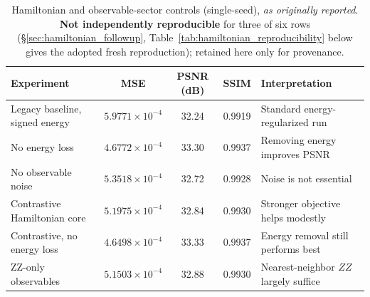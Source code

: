 \documentclass[11pt]{article}
\begin{document}
\begin{table}[H]
\centering
\caption{Hamiltonian and observable-sector controls (single-seed), \emph{as originally reported}. \textbf{Not independently reproducible} for three of six rows (\S\ref{sec:hamiltonian_followup}, Table~\ref{tab:hamiltonian_reproducibility} below gives the adopted fresh reproduction); retained here only for provenance.}
\label{tab:hamiltonian_controls_supp}
\scriptsize
\begin{tabular}{p{}cccp{}}
\toprule
Experiment & MSE & PSNR (dB) & SSIM & Interpretation \\
\midrule
Legacy baseline, signed energy & $5.9771\times10^{-4}$ & 32.24 & 0.9919 & Standard energy-regularized run \\
No energy loss & $4.6772\times10^{-4}$ & 33.30 & 0.9937 & Removing energy improves PSNR \\
No observable noise & $5.3518\times10^{-4}$ & 32.72 & 0.9928 & Noise is not essential \\
Contrastive Hamiltonian core & $5.1975\times10^{-4}$ & 32.84 & 0.9930 & Stronger objective helps modestly \\
Contrastive, no energy loss & $4.6498\times10^{-4}$ & 33.33 & 0.9937 & Energy removal still performs best \\
ZZ-only observables & $5.1503\times10^{-4}$ & 32.88 & 0.9930 & Nearest-neighbor $ZZ$ largely suffice \\
\bottomrule
\end{tabular}
\end{table}
\end{document}
